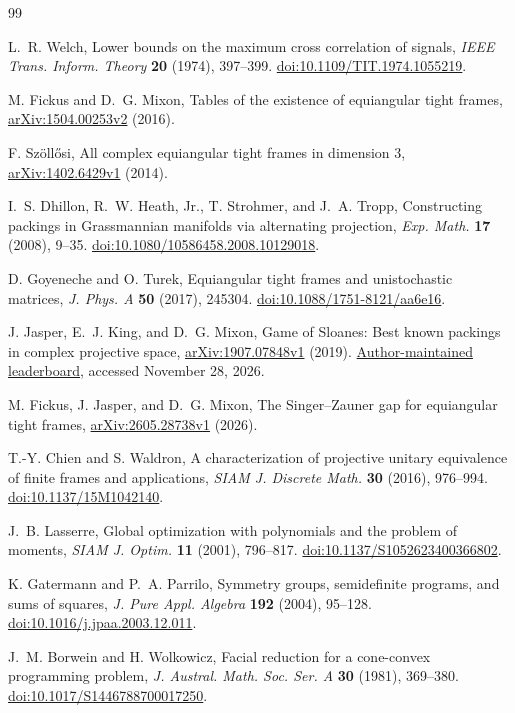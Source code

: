 \begin{thebibliography}{99}

L.~R. Welch, Lower bounds on the maximum cross correlation of signals,
\emph{IEEE Trans. Inform. Theory} \textbf{20} (1974), 397--399.
\href{https://doi.org/10.1109/TIT.1974.1055219}{doi:10.1109/TIT.1974.1055219}.

M. Fickus and D.~G. Mixon, Tables of the existence of equiangular tight frames,
\href{https://arxiv.org/abs/1504.00253v2}{arXiv:1504.00253v2} (2016).

F. Sz\"oll\H{o}si, All complex equiangular tight frames in dimension 3,
\href{https://arxiv.org/abs/1402.6429v1}{arXiv:1402.6429v1} (2014).

I.~S. Dhillon, R.~W. Heath, Jr., T. Strohmer, and J.~A. Tropp,
Constructing packings in Grassmannian manifolds via alternating projection,
\emph{Exp. Math.} \textbf{17} (2008), 9--35.
\href{https://doi.org/10.1080/10586458.2008.10129018}{doi:10.1080/10586458.2008.10129018}.

D. Goyeneche and O. Turek, Equiangular tight frames and unistochastic matrices,
\emph{J. Phys. A} \textbf{50} (2017), 245304.
\href{https://doi.org/10.1088/1751-8121/aa6e16}{doi:10.1088/1751-8121/aa6e16}.

J. Jasper, E.~J. King, and D.~G. Mixon, Game of Sloanes: Best known packings in complex projective space,
\href{https://arxiv.org/abs/1907.07848v1}{arXiv:1907.07848v1} (2019).
\href{https://github.com/gnikylime/GameofSloanes#leader-board}{Author-maintained leaderboard}, accessed November 28, 2026.

M. Fickus, J. Jasper, and D.~G. Mixon,
The Singer--Zauner gap for equiangular tight frames,
\href{https://arxiv.org/abs/2605.28738v1}{arXiv:2605.28738v1} (2026).

T.-Y. Chien and S. Waldron,
A characterization of projective unitary equivalence of finite frames and applications,
\emph{SIAM J. Discrete Math.} \textbf{30} (2016), 976--994.
\href{https://doi.org/10.1137/15M1042140}{doi:10.1137/15M1042140}.

J.~B. Lasserre, Global optimization with polynomials and the problem of moments,
\emph{SIAM J. Optim.} \textbf{11} (2001), 796--817.
\href{https://doi.org/10.1137/S1052623400366802}{doi:10.1137/S1052623400366802}.

K. Gatermann and P.~A. Parrilo, Symmetry groups, semidefinite programs, and sums of squares,
\emph{J. Pure Appl. Algebra} \textbf{192} (2004), 95--128.
\href{https://doi.org/10.1016/j.jpaa.2003.12.011}{doi:10.1016/j.jpaa.2003.12.011}.

J.~M. Borwein and H. Wolkowicz, Facial reduction for a cone-convex programming problem,
\emph{J. Austral. Math. Soc. Ser. A} \textbf{30} (1981), 369--380.
\href{https://doi.org/10.1017/S1446788700017250}{doi:10.1017/S1446788700017250}.

\end{thebibliography}
